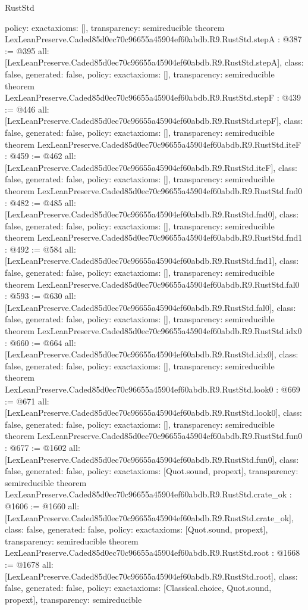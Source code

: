 \begin{lexlean}{RustStd}
\begin{coremodule}
{  policy: exact{axioms: []},
  transparency: semireducible
}
theorem LexLeanPreserve.Caded85d0ec70c96655a45904ef60abdb.R9.RustStd.stepA : @387 := @395 {
  all: [LexLeanPreserve.Caded85d0ec70c96655a45904ef60abdb.R9.RustStd.stepA],
  class: false,
  generated: false,
  policy: exact{axioms: []},
  transparency: semireducible
}
theorem LexLeanPreserve.Caded85d0ec70c96655a45904ef60abdb.R9.RustStd.stepF : @439 := @446 {
  all: [LexLeanPreserve.Caded85d0ec70c96655a45904ef60abdb.R9.RustStd.stepF],
  class: false,
  generated: false,
  policy: exact{axioms: []},
  transparency: semireducible
}
theorem LexLeanPreserve.Caded85d0ec70c96655a45904ef60abdb.R9.RustStd.iteF : @459 := @462 {
  all: [LexLeanPreserve.Caded85d0ec70c96655a45904ef60abdb.R9.RustStd.iteF],
  class: false,
  generated: false,
  policy: exact{axioms: []},
  transparency: semireducible
}
theorem LexLeanPreserve.Caded85d0ec70c96655a45904ef60abdb.R9.RustStd.fnd0 : @482 := @485 {
  all: [LexLeanPreserve.Caded85d0ec70c96655a45904ef60abdb.R9.RustStd.fnd0],
  class: false,
  generated: false,
  policy: exact{axioms: []},
  transparency: semireducible
}
theorem LexLeanPreserve.Caded85d0ec70c96655a45904ef60abdb.R9.RustStd.fnd1 : @492 := @584 {
  all: [LexLeanPreserve.Caded85d0ec70c96655a45904ef60abdb.R9.RustStd.fnd1],
  class: false,
  generated: false,
  policy: exact{axioms: []},
  transparency: semireducible
}
theorem LexLeanPreserve.Caded85d0ec70c96655a45904ef60abdb.R9.RustStd.fal0 : @593 := @630 {
  all: [LexLeanPreserve.Caded85d0ec70c96655a45904ef60abdb.R9.RustStd.fal0],
  class: false,
  generated: false,
  policy: exact{axioms: []},
  transparency: semireducible
}
theorem LexLeanPreserve.Caded85d0ec70c96655a45904ef60abdb.R9.RustStd.idx0 : @660 := @664 {
  all: [LexLeanPreserve.Caded85d0ec70c96655a45904ef60abdb.R9.RustStd.idx0],
  class: false,
  generated: false,
  policy: exact{axioms: []},
  transparency: semireducible
}
theorem LexLeanPreserve.Caded85d0ec70c96655a45904ef60abdb.R9.RustStd.look0 : @669 := @671 {
  all: [LexLeanPreserve.Caded85d0ec70c96655a45904ef60abdb.R9.RustStd.look0],
  class: false,
  generated: false,
  policy: exact{axioms: []},
  transparency: semireducible
}
theorem LexLeanPreserve.Caded85d0ec70c96655a45904ef60abdb.R9.RustStd.fun0 : @677 := @1602 {
  all: [LexLeanPreserve.Caded85d0ec70c96655a45904ef60abdb.R9.RustStd.fun0],
  class: false,
  generated: false,
  policy: exact{axioms: [Quot.sound, propext]},
  transparency: semireducible
}
theorem LexLeanPreserve.Caded85d0ec70c96655a45904ef60abdb.R9.RustStd.crate_ok : @1606 := @1660 {
  all: [LexLeanPreserve.Caded85d0ec70c96655a45904ef60abdb.R9.RustStd.crate_ok],
  class: false,
  generated: false,
  policy: exact{axioms: [Quot.sound, propext]},
  transparency: semireducible
}
theorem LexLeanPreserve.Caded85d0ec70c96655a45904ef60abdb.R9.RustStd.root : @1668 := @1678 {
  all: [LexLeanPreserve.Caded85d0ec70c96655a45904ef60abdb.R9.RustStd.root],
  class: false,
  generated: false,
  policy: exact{axioms: [Classical.choice, Quot.sound, propext]},
  transparency: semireducible
}


\end{coremodule}
\end{lexlean}
